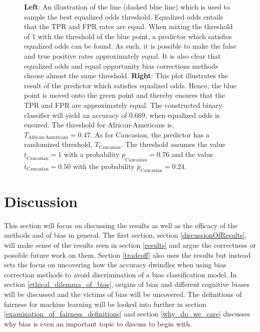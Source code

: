 \documentclass[11pt, fleqn, titlepage]{article}
\begin{document}
\begin{figure}[H]
		\caption{\textbf{Left}: An illustration of the line (dashed blue line) which is used to sample the best equalized odds threshold. Equalized odds entails that the TPR and FPR rates are equal. When mixing the threshold of 1 with the threshold of the blue point, a predictor which satisfies equalized odds can be found. As such, it is possible to make the false and true positive rates approximately equal. It is also clear that equalized odds and equal opportunity bias corrections methods choose almost the same threshold.  \textbf{Right}: This plot illustrates the result of the predictor which satisfies equalized odds. Hence, the blue point is moved onto the green point and thereby ensures that the TPR and FPR are approximately equal. The constructed binary classifier will yield an accuracy of $ 0.669 $, when equalized odds is ensured. The threshold for African-Americans is, $ T_{\text{African-Americans}} = 0.47 $. As for Caucasian, the predictor has a randomized threshold, $ T_{\text{Caucasian}} $. The threshold assumes the value $\underline t_{\text{Caucasian}} = 1 $  with a probability $ \underline p_{\text{Caucasian}}= 0.76 $ and the value $ \bar t_{\text{Caucasian}} = 0.50 $ with the probability $\bar p_{\text{Caucasian}} = 0.24 $.}
		\label{fig:equalizedOdds}
	\end{figure}
	
	\section{Discussion} \label{discussion}
	
	This section will focus on discussing the results as well as the efficacy of the methods and of bias in general. The first section, section \ref{discussionOfResults}, will make sense of the results seen in section \ref{results} and argue the correctness or possible future work on them. Section \ref{tradeoff} also uses the results but instead sets the focus on uncovering how the accuracy dwindles when using bias correction methods to avoid discrimination of a bias classification model. In section \ref{ethical_dilemma_of_bias}, origins of bias and different cognitive biases will be discussed and the victims of bias will be uncovered. The definitions of fairness for machine learning will be looked into further in section \ref{examination_of_fairness_definitions} and section \ref{why_do_we_care} discusses why bias is even an important topic to discuss to begin with.
	
\end{document}

